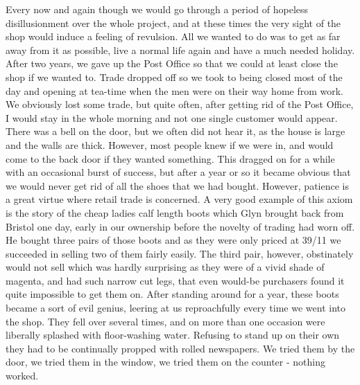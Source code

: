 Every now and again though we would go through a period of hopeless disillusionment over the whole project, and at these times the very sight of the shop would induce a feeling of revulsion. All we wanted to do was to get as far away from it as possible, live a normal life again and have a much needed holiday. After two years, we gave up the Post Office so that we could at least close the shop if we wanted to. Trade dropped off so we took to being closed most of the day and opening at tea-time when the men were on their way home from work. We obviously lost some trade, but quite often, after getting rid of the Post Office, I would stay in the whole morning and not one single customer would appear. There was a bell on the door, but we often did not hear it, as the house is large and the walls are thick. However, most people knew if we were in, and would come to the back door if they wanted something. This dragged on for a while with an occasional burst of success, but after a year or so it became obvious that we would never get rid of all the shoes that we had bought. However, patience is a great virtue where retail trade is concerned. A very good example of this axiom is the story of the cheap ladies calf length boots which Glyn brought back from Bristol one day, early in our ownership before the novelty of trading had worn off. He bought three pairs of those boots and as they were only priced at 39/11 we succeeded in selling two of them fairly easily. The third pair, however, obstinately would not sell which was hardly surprising as they were of a vivid shade of magenta, and had such narrow cut legs, that even would-be purchasers found it quite impossible to get them on. After standing around for a year, these boots became a sort of evil genius, leering at us reproachfully every time we went into the shop. They fell over several times, and on more than one occasion were liberally splashed with floor-washing water. Refusing to stand up on their own they had to be continually propped with rolled newspapers. We tried them by the door, we tried them in the window, we tried them on the counter - nothing worked.

